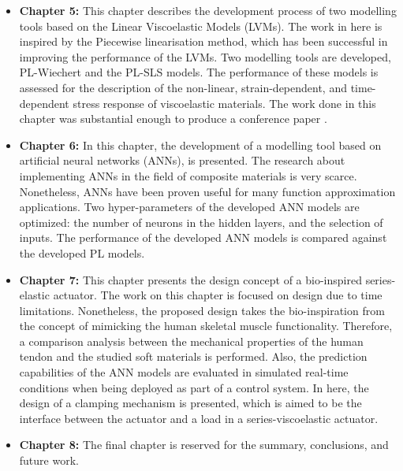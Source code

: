 \begin{itemize}
    \item {\bf Chapter 5: } This chapter describes the development process of two modelling tools based on the Linear Viscoelastic Models (LVMs). The work in here is inspired by the Piecewise linearisation method, which has been successful in improving the performance of the LVMs. Two modelling tools are developed, PL-Wiechert and the PL-SLS models. The performance of these models is assessed for the description of the non-linear, strain-dependent, and time-dependent stress response of viscoelastic materials. The work done in this chapter was substantial enough to produce a conference paper \cite{solis2018assessment}.
    \item {\bf Chapter 6: } In this chapter, the development of a modelling tool based on artificial neural networks (ANNs), is presented. The research about implementing ANNs in the field of composite materials is very scarce. Nonetheless, ANNs have been proven useful for many function approximation applications. Two hyper-parameters of the developed ANN models are optimized: the number of neurons in the hidden layers, and the selection of inputs. The performance of the developed ANN models is compared against the developed PL models.
    \item {\bf Chapter 7: } This chapter presents the design concept of a bio-inspired series-elastic actuator. The work on this chapter is focused on design due to time limitations. Nonetheless, the proposed design takes the bio-inspiration from the concept of mimicking the human skeletal muscle functionality. Therefore, a comparison analysis between the mechanical properties of the human tendon and the studied soft materials is performed. Also, the prediction capabilities of the ANN models are evaluated in simulated real-time conditions when being deployed as part of a control system. In here, the design of a clamping mechanism is presented, which is aimed to be the interface between the actuator and a load in a series-viscoelastic actuator.
    \item {\bf Chapter 8: } The final chapter is reserved for the summary, conclusions, and future work.
\end{itemize}